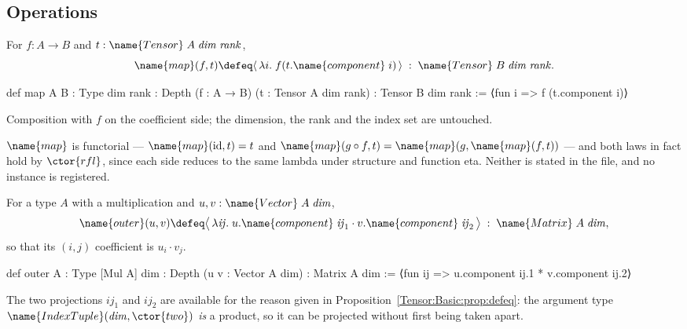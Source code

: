 \subsection{Operations}

\begin{definition}
\label{Tensor:Basic:def:map}
For $f : A \to B$ and $t : \name{Tensor}\;A\;\mathit{dim}\;\mathit{rank}$,
\[
  \name{map}(f, t) \defeq
    \langle\, \lambda i.\; f(t.\name{component}\;i) \,\rangle
  \;:\; \name{Tensor}\;B\;\mathit{dim}\;\mathit{rank}.
\]
\end{definition}

\begin{leancode}
def map {A B : Type} {dim rank : Depth} (f : A → B)
    (t : Tensor A dim rank) : Tensor B dim rank :=
  ⟨fun i => f (t.component i)⟩
\end{leancode}

Composition with $f$ on the coefficient side; the dimension, the rank and the
index set are untouched.

\begin{remark}\label{Tensor:Basic:rem:map-laws}
$\name{map}$ is functorial --- $\name{map}(\mathrm{id}, t) = t$ and
$\name{map}(g \circ f, t) = \name{map}(g, \name{map}(f, t))$ --- and both laws
in fact hold by $\ctor{rfl}$, since each side reduces to the same lambda under
structure and function eta.  Neither is stated in the file, and no
 instance is registered.
\end{remark}

\begin{definition}
\label{Tensor:Basic:def:outer}
For a type $A$ with a multiplication and
$u, v : \name{Vector}\;A\;\mathit{dim}$,
\[
  \name{outer}(u, v) \defeq
    \bigl\langle\, \lambda \mathit{ij}.\;
      u.\name{component}\;\mathit{ij}_1 \cdot
      v.\name{component}\;\mathit{ij}_2 \,\bigr\rangle
  \;:\; \name{Matrix}\;A\;\mathit{dim},
\]
so that its $(i,j)$ coefficient is $u_i \cdot v_j$.
\end{definition}

\begin{leancode}
def outer {A : Type} [Mul A] {dim : Depth}
    (u v : Vector A dim) : Matrix A dim :=
  ⟨fun ij => u.component ij.1 * v.component ij.2⟩
\end{leancode}

The two projections $\mathit{ij}_1$ and $\mathit{ij}_2$ are available for the
reason given in Proposition~\ref{Tensor:Basic:prop:defeq}: the argument type
$\name{IndexTuple}(\mathit{dim}, \ctor{two})$ \emph{is} a product, so it can be
projected without first being taken apart.

